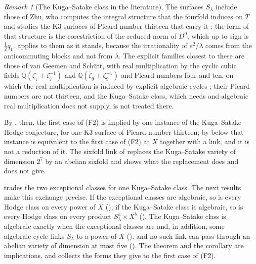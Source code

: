 \documentclass[11pt,reqno]{amsart}
\theoremstyle{plain}
\theoremstyle{definition}
\theoremstyle{remark}
\newtheorem{remark}[theorem]{Remark}
\newcommand{\QQ}{\mathbb{Q}}
\begin{document}
\begin{remark}[The Kuga--Satake class in the literature]
The surfaces $S_{\lambda}$ include those of Zhu, who computes the integral
structure that the fourfold induces on $T$ and studies the K3 surfaces of
Picard number thirteen that carry it \cite{Zhu18}; the form of that structure
is the corestriction of the reduced norm of $D^{0}$, which up to sign is
$\frac12q_{1}$.  applies to them as it stands, because the
irrationality of $e^{2}/\lambda$ comes from the anticommuting blocks and not
from $\lambda$. The explicit families closest to these are those of van
Geemen and Sch\"utt, with
real multiplication by the cyclic cubic fields $\QQ(\zeta_{7}+\zeta_{7}^{-1})$
and $\QQ(\zeta_{9}+\zeta_{9}^{-1})$ and Picard numbers four and ten, on which
the real multiplication is induced by explicit algebraic cycles
\cite[Theorem~1.2 and Section~4.8]{vGS25}; their Picard numbers are not
thirteen, and the Kuga--Satake class, which  needs and
algebraic real multiplication does not supply, is not treated there.

By , then, the first case of (F2) is implied by one
instance of the Kuga--Satake Hodge conjecture, for one K3 surface of Picard
number thirteen; by  below that instance is
equivalent to the first case of (F2) at $X$ together with a link, and it is
not a reduction of it. The sixfold link of \cite{BB26dense} replaces the Kuga--Satake variety
of dimension $2^{7}$ by an abelian sixfold and shows what the replacement
does and does not give.
\end{remark}

 trades the two exceptional classes for one Kuga--Satake
class. The next results make this exchange precise. If the
exceptional classes are algebraic, so is every Hodge class on every power of
$X$ (); if the Kuga--Satake class is algebraic, so is
every Hodge class on every product $S_{\lambda}^{a}\times X^{b}$
(). The Kuga--Satake class is algebraic exactly
when the exceptional classes are and, in addition, some algebraic cycle links
$S_{\lambda}$ to a power of $X$ (), and no such link
can pass through an abelian variety of dimension at most five
(). The theorem and the corollary are
implications, and  collects the forms they give
to the first case of (F2).
\end{document}
